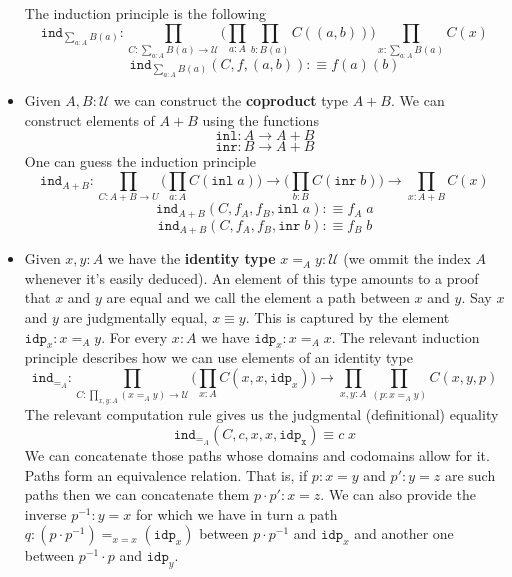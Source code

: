 \documentclass[12pt]{report}
\theoremstyle{definition}
\begin{document}
\begin{itemize}
	The induction principle is the following
	$$\mathtt{ind}_{\sum_{a:A}B(a)} : \prod_{C : \sum_{a:A}B(a) \rightarrow \mathcal{U}}\Big( \prod_{a : A}\prod_{b : B(a)}C((a,b)) \Big)\prod_{x : \sum_{a:A}B(a)}C(x)$$
	$$\mathtt{ind}_{\sum_{a:A}B(a)}(C, f,(a,b) ) :\equiv f(a)(b)$$
	\item Given $A, B : \mathcal{U}$ we can construct the \textbf{coproduct} type $A + B$. 
	We can construct elements of $A + B$ using the functions
	$$\mathtt{inl} : A \rightarrow A+B$$
	$$\mathtt{inr} : B \rightarrow A+B$$
	One can guess the induction principle
	$$\mathtt{ind}_{A+B} : \prod_{C : A+B \rightarrow U} \Big(\prod_{a : A}C(\mathtt{inl}\;a)\Big) \rightarrow \Big(\prod_{b : B}C(\mathtt{inr}\;b)\Big) \rightarrow \prod_{x : A+ B}C(x)$$
	$$\mathtt{ind}_{A+B}(C, f_A, f_B, \mathtt{inl}\; a) :\equiv f_A\; a$$
	$$\mathtt{ind}_{A+B}(C, f_A, f_B, \mathtt{inr}\; b) :\equiv f_B\; b$$
	\item Given $x, y : A$ we have the \textbf{identity type} $x =_A y : \mathcal{U}$ (we ommit the index $A$ whenever it's easily deduced). 
	An element of this type amounts to a proof that $x$ and $y$ are equal and we call the element a path between $x$ and $y$. 
	Say $x$ and $y$ are judgmentally equal, $x \equiv y$. 
	This is captured by the element $\mathtt{idp}_x : x =_A y$. 
	For every $x  :A$ we have $\mathtt{idp}_x : x=_A x$. 
	The relevant induction principle describes how we can use elements of an identity type
	$$\mathtt{ind}_{=_{A}} : \prod_{C : \prod_{x,y : A} (x =_A y) \rightarrow \mathcal{U}} \Big( \prod_{x : A}C(x,x,\mathtt{idp}_x) \Big) \rightarrow \prod_{x,y : A} \prod_{(p : x =_A y)} C(x,y,p)$$
	The relevant computation rule gives us the judgmental (definitional) equality 
	$$\mathtt{ind}_{=_A} (C,c,x,x,\mathtt{idp_x}) \equiv c\; x$$
	We can concatenate those paths whose domains and codomains allow for it. 
	Paths form an equivalence relation. That is, if $p : x = y$ and $p' : y = z$ are such paths then we can concatenate them $p \cdot p' : x = z$. 
	We can also provide the inverse $p^{-1} : y = x$ for which we have in turn a path $q : (p\cdot p^{-1}) =_{x=x} (\mathtt{idp}_x)$ between $p\cdot p^{-1}$ and $\mathtt{idp}_x$ and another one between $p^{-1}\cdot p$ and $\mathtt{idp}_y$. 


\end{itemize}
\end{document}
